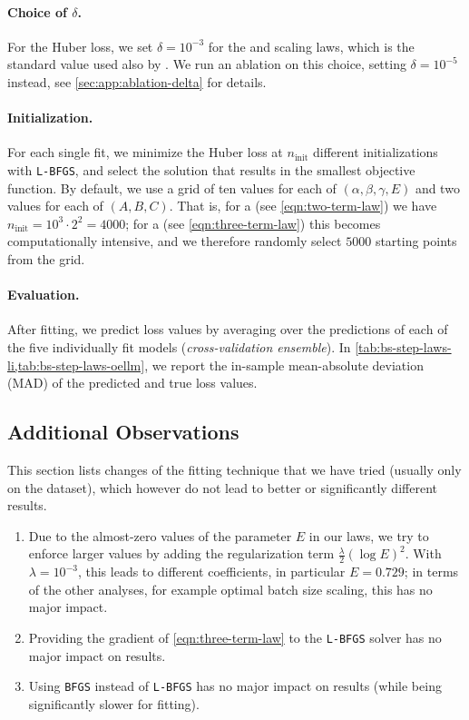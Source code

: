 \paragraph{Choice of $\delta$.} For the Huber loss, we set $\delta=10^{-3}$ for the \ttl{} and \tttl{} scaling laws, which is the standard value used also by \citet{Besiroglu2024}. We run an ablation on this choice, setting  $\delta =10^{-5}$ instead, see \cref{sec:app:ablation-delta} for details.

\paragraph{Initialization.} For each single fit, we minimize the Huber loss at $n_{\text{init}}$ different initializations  with \texttt{L-BFGS}, and select the solution that results in the smallest objective function. By default, we use a grid of ten values for each of $(\alpha, \beta, \gamma, E)$ and two values for each of $(A,B,C)$. That is, for a \ttl{} (see \eqref{eqn:two-term-law}) we have $n_{\text{init}} =  10^3 \cdot 2^2=4000$; for a \tttl{} (see \eqref{eqn:three-term-law}) this becomes computationally intensive, and we therefore randomly select $5000$ starting points from the grid. 

\paragraph{Evaluation.} After fitting, we predict loss values by averaging over the predictions of each of the five individually fit models (\emph{cross-validation ensemble}). In \cref{tab:bs-step-laws-li,tab:bs-step-laws-oellm}, we report the in-sample mean-absolute deviation (MAD) of the predicted and true loss values.

\subsection{Additional Observations}\label{sec:app:additional-observations}
This section lists changes of the fitting technique that we have tried (usually only on the \li{} dataset), which however do not lead to better or significantly different results.
%
\begin{enumerate}[label=(\Roman*)]
    \item Due to the almost-zero values of the parameter $E$ in our laws, we try to enforce larger values by adding the regularization term $\frac{\lambda}{2}(\log{E})^2$. With $\lambda=10^{-3}$, this leads to different coefficients, in particular $E=0.729$; in terms of the other analyses, for example optimal batch size scaling, this has no major impact.
    \item Providing the gradient of \eqref{eqn:three-term-law} to the \texttt{L-BFGS} solver has no major impact on results.
    \item Using \texttt{BFGS} instead of \texttt{L-BFGS} has no major impact on results (while being significantly slower for fitting).
\end{enumerate}

